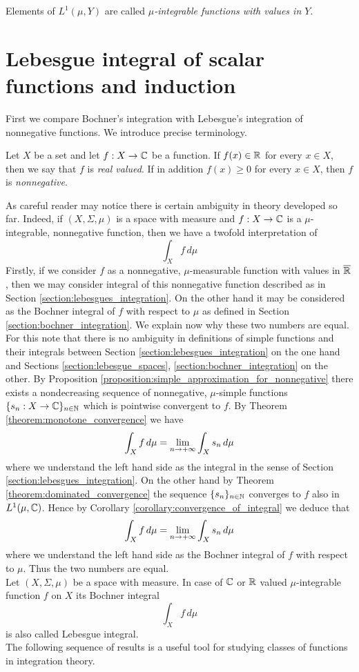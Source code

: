 \begin{definition}
    Elements of $L^1(\mu,Y)$ are called \textit{$\mu$-integrable functions with values in $Y$}.
\end{definition}

\section{Lebesgue integral of scalar functions and induction}
\noindent
First we compare Bochner's integration with Lebesgue's integration of nonnegative functions. We introduce precise terminology.

\begin{definition}
    Let $X$ be a set and let $f:X\rightarrow {\mathbb C}$ be a function. If $f(x)\in {\mathbb R}$ for every $x\in X$, then we say that $f$ is \textit{real valued}. If in addition $f(x)\geq 0$ for every $x\in X$, then $f$ is \textit{nonnegative}.
\end{definition}
\noindent
As careful reader may notice there is certain ambiguity in theory developed so far. Indeed, if $(X,\Sigma,\mu)$ is a space with measure and $f:X\rightarrow {\mathbb C}$ is a $\mu$-integrable, nonnegative function, then we have a twofold interpretation of
$$\int_Xf\,d\mu$$
Firstly, if we consider $f$ as a nonnegative, $\mu$-measurable function with values in $\overline{{\mathbb R}}$, then we may consider integral of this nonnegative function described as in Section \ref{section:lebesgues_integration}. On the other hand it may be considered as the Bochner integral of $f$ with respect to $\mu$ as defined in Section \ref{section:bochner_integration}. We explain now why these two numbers are equal. For this note that there is no ambiguity in definitions of simple functions and their integrals between Section \ref{section:lebesgues_integration} on the one hand and Sections \ref{section:lebesgue_spaces}, \ref{section:bochner_integration} on the other. By Proposition \ref{proposition:simple_approximation_for_nonnegative} there exists a nondecreasing sequence of nonnegative, $\mu$-simple functions $\{s_n:X\rightarrow {\mathbb C}\}_{n\in {\mathbb N}}$ which is pointwise convergent to $f$. By Theorem \ref{theorem:monotone_convergence} we have
$$\int_Xf\,d\mu = \lim_{n\rightarrow +\infty}\int_Xs_n\,d\mu$$
where we understand the left hand side as the integral in the sense of Section \ref{section:lebesgues_integration}. On the other hand by Theorem \ref{theorem:dominated_convergence} the sequence $\{s_n\}_{n\in {\mathbb N}}$ converges to $f$ also in $L^1(\mu,{\mathbb C})$. Hence by Corollary \ref{corollary:convergence_of_integral} we deduce that
$$\int_Xf\,d\mu = \lim_{n\rightarrow +\infty}\int_Xs_n\,d\mu$$
where we understand the left hand side as the Bochner integral of $f$ with respect to $\mu$. Thus the two numbers are equal.\\
Let $(X,\Sigma, \mu)$ be a space with measure. In case of ${\mathbb C}$ or ${\mathbb R}$ valued $\mu$-integrable function $f$ on $X$ its Bochner integral
$$\int_X f\,d\mu$$
is also called Lebesgue integral.\\
The following sequence of results is a useful tool for studying classes of functions in integration theory.

